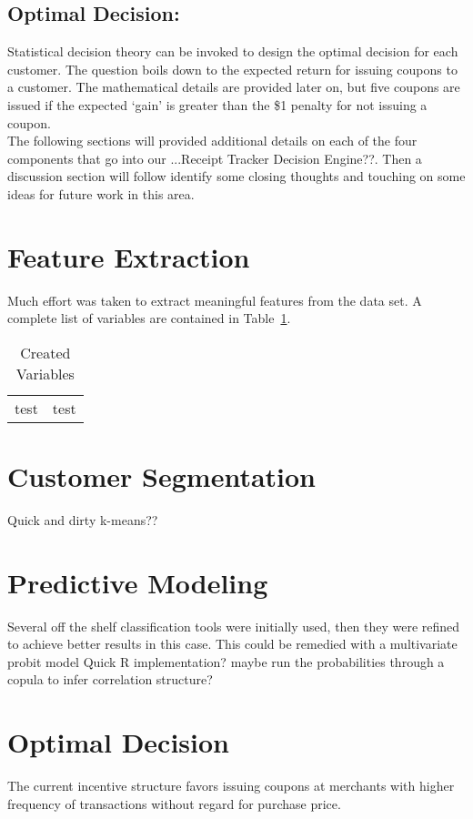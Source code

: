 \documentclass[12pt]{article} %
\begin{document}
\subsection*{Optimal Decision:} 
Statistical decision theory can be invoked to design the optimal decision for each customer.  The question boils down to the expected return for issuing coupons to a customer.  The mathematical details are provided later on, but five coupons are issued if the expected `gain' is greater than the \$1 penalty for not issuing a coupon.\\

The following sections will provided additional details on each of the four components that go into our ...\ac{Receipt Tracker Decision Engine??}.  Then a discussion section will follow identify some closing thoughts and touching on some ideas for future work in this area. 
\section{Feature Extraction}
Much effort was taken to extract meaningful features from the data set.  A complete list of variables are contained in Table~\ref{tab:vars}.

\begin{table}[h!]
\caption{Created Variables}
\begin{center}
\begin{tabular}{|c|c|}
test & test
\end{tabular}
\end{center}
\label{tab:vars}
\end{table}%

\section{Customer Segmentation}
Quick and dirty k-means??
\section{Predictive Modeling}
Several off the shelf classification tools were initially used, then they were refined to achieve better results in this case.
 This could be remedied with a multivariate probit model \ac{ Quick R implementation?  maybe run the probabilities through a copula to infer correlation structure?}
\section{Optimal Decision}
The current incentive structure favors issuing coupons at merchants with higher frequency of transactions without regard for purchase price.  
\end{document}
